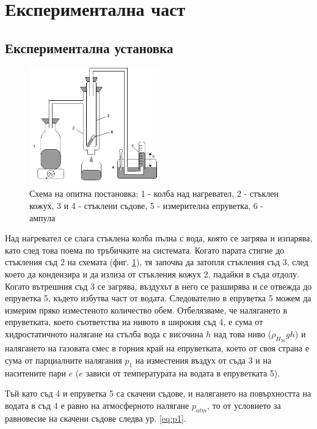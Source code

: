 \documentclass[12pt]{article}
\begin{document}
\section{Експериментална част}

\subsection{Експериментална установка}
\begin{figure}
    \centering
    \includegraphics[width=0.5\textwidth]{images/setup-victor-meyer.drawio.png}
    \caption{\label{fig:setup}Схема на опитна постановка; 1 - колба над нагревател, 2 - стъклен кожух, 3 и 4 - стъклени съдове, 5 - измерителна епруветка, 6 - ампула}
    \label{fig:setup}
\end{figure}

Над нагревател се слага стъклена колба пълна с вода, която се загрява и изпарява, като след това поема по тръбичките на системата. Когато парата стигне до стъкления съд 2 на схемата (фиг. \ref{fig:setup}), тя започва да затопля стъкления съд 3, след което да кондензира и да излиза от стъкления кожух 2, падайки в съда отдолу. Когато вътрешния съд 3 се загрява, въздухът в него се разширява и се отвежда до епруветка 5, където избутва част от водата. Следователно в епруветка 5 можем да измерим пряко изместеното количество обем. Отбелязваме, че налягането в епруветката, което съответства на нивото в широкия съд 4, е сума от хидростатичното налягане на стълба вода с височина $h$ над това ниво ($\rho_{H_20}gh$) и налягането на газовата смес в горния край на епруветката, което от своя страна е сума от парциалните налягания $p_1$ на изместения въздух от съда 3 и на наситените пари $e$ ($e$ зависи от температурата на водата в епруветката 5). 

Тъй като съд 4 и епруветка 5 са скачени съдове, и налягането на повърхността на водата в съд 4 е равно на атмосферното налягане $p_{atm}$, то от условието за равновесие на скачени съдове следва ур. \ref{eq:p1}. 
\end{document}
